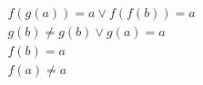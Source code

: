 \begin{align*}
%
& f(g(a)) = a \lor f(f(b)) = a
~\\~
& g(b)  \neq  g(b) \lor g(a) = a
~\\~
& f(b) = a
~\\~
& f(a)  \neq  a
%
\end{align*}
